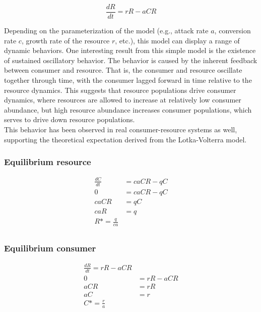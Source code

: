 \documentclass[12pt]{article}
\begin{document}
\begin{equation}
\frac{dR}{dt} = rR - aCR
\end{equation}




Depending on the parameterization of the model (e.g., attack rate $a$, conversion rate $c$, growth rate of the resource $r$, etc.), this model can display a range of dynamic behaviors. One interesting result from this simple model is the existence of sustained oscillatory behavior. The behavior is caused by the inherent feedback between consumer and resource. That is, the consumer and resource oscillate together through time, with the consumer lagged forward in time relative to the resource dynamics. This suggests that resource populations drive consumer dynamics, where resources are allowed to increase at relatively low consumer abundance, but high resource abundance increases consumer populations, which serves to drive down resource populations. \\


This behavior has been observed in real consumer-resource systems as well, supporting the theoretical expectation derived from the Lotka-Volterra model.  \\




\bigskip


\subsubsection*{Equilibrium resource}

\begin{align}
\frac{dC}{dt} & = caCR - qC \\  
0 & = caCR - qC \\
caCR & = qC \\
caR & = q \\
R* = \frac{q}{ca} \\
\end{align}


\subsubsection*{Equilibrium consumer}

\begin{align}
\frac{dR}{dt} = rR - aCR \\
0 & = rR - aCR\\
aCR & = rR \\
aC & = r \\
C* = \frac{r}{a} \\
\end{align}
\end{document}
